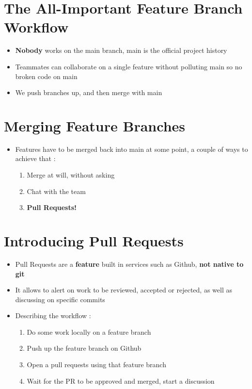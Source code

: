 \documentclass{report}
\begin{document}
\section{The All-Important Feature Branch Workflow}

\begin{itemize}
	\item \textbf{Nobody} works on the main branch, main is the official project history 
	\item Teammates can collaborate on a single feature without polluting main so no broken code on main 
	\item We push branches up, and then merge with main
\end{itemize}

\section{Merging Feature Branches}

\begin{itemize}
	\item Features have to be merged back into main at some point, a couple of ways to achieve that :
		\begin{enumerate}
			\item Merge at will, without asking 
			\item Chat with the team 
			\item \textbf{Pull Requests!} 
		\end{enumerate}
\end{itemize}

\section{Introducing Pull Requests}

\begin{itemize}
	\item Pull Requests are a \textbf{feature} built in services such as Github, \textbf{not native to git} 
	\item It allows to alert on work to be reviewed, accepted or rejected, as well as discussing on specific commits 
	\item Describing the workflow :
		\begin{enumerate}
			\item Do some work locally on a feature branch 
			\item Push up the feature branch on Github 
			\item Open a pull requests using that feature branch 
			\item Wait for the PR to be approved and merged, start a discussion
		\end{enumerate}
\end{itemize}
\end{document}
